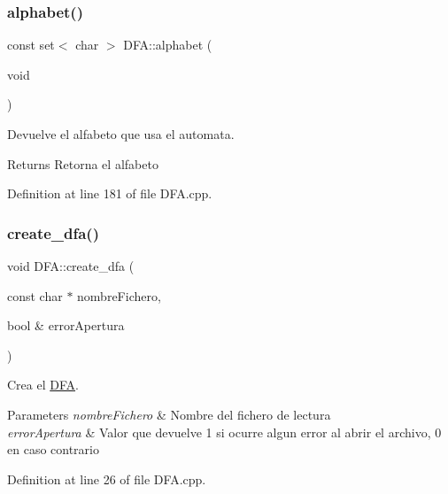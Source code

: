 \subsubsection{\texorpdfstring{alphabet()}{alphabet()}}
{\footnotesize\ttfamily const set$<$ char $>$ D\+F\+A\+::alphabet (\begin{DoxyParamCaption}\item[{void}]{ }\end{DoxyParamCaption})}



Devuelve el alfabeto que usa el automata. 

\begin{DoxyReturn}{Returns}
Retorna el alfabeto 
\end{DoxyReturn}


Definition at line 181 of file D\+F\+A.\+cpp.

\mbox{\label{class_d_f_a_a31d1ae734a752f28753d5fa3031c4f0c}} 
\subsubsection{\texorpdfstring{create\+\_\+dfa()}{create\_dfa()}\hspace{0.1cm}{\footnotesize\ttfamily [1/2]}}
{\footnotesize\ttfamily void D\+F\+A\+::create\+\_\+dfa (\begin{DoxyParamCaption}\item[{const char $\ast$}]{nombre\+Fichero,  }\item[{bool \&}]{error\+Apertura }\end{DoxyParamCaption})}



Crea el \hyperlink{class_d_f_a}{D\+FA}. 


\begin{DoxyParams}{Parameters}
{\em nombre\+Fichero} & Nombre del fichero de lectura \\
\hline
{\em error\+Apertura} & Valor que devuelve 1 si ocurre algun error al abrir el archivo, 0 en caso contrario \\
\hline
\end{DoxyParams}


Definition at line 26 of file D\+F\+A.\+cpp.

\mbox{\label{class_d_f_a_a06e28de0df3c54afe35ecebe60e88484}} 
